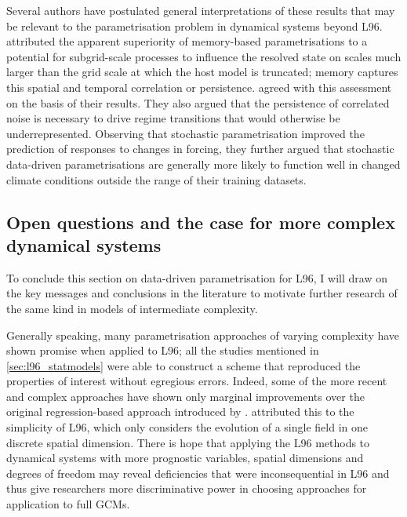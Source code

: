 \documentclass[titlepage,twoside]{article}
\numberwithin{equation}{section}
\begin{document}
Several authors have postulated general interpretations of these results that
may be relevant to the parametrisation problem in dynamical systems beyond L96.
\textcite{arnold2013} attributed the apparent superiority of memory-based
parametrisations to a potential for subgrid-scale processes to influence the
resolved state on scales much larger than the grid scale at which the host
model is truncated; memory captures this spatial and temporal correlation or
persistence. \textcite{christensen2015} agreed with this assessment on the
basis of their results. They also argued that the persistence of correlated
noise is necessary to drive regime transitions that would otherwise be
underrepresented. Observing that stochastic parametrisation improved the
prediction of responses to changes in forcing, they further argued that
stochastic data-driven parametrisations are generally more likely to function
well in changed climate conditions outside the range of their training
datasets.


\subsection{Open questions and the case for more complex dynamical systems}
To conclude this section on data-driven parametrisation for L96, I will draw on
the key messages and conclusions in the literature to motivate further research
of the same kind in models of intermediate complexity.

Generally speaking, many parametrisation approaches of varying complexity have
shown promise when applied to L96; all the studies mentioned in
\cref{sec:l96_statmodels} were able to construct a scheme that reproduced the
properties of interest without egregious errors. Indeed, some of the more
recent and complex approaches have shown only marginal improvements over the
original regression-based approach introduced by \textcite{wilks2005}.
\textcite{gagne2020} attributed this to the simplicity of L96, which only
considers the evolution of a single field in one discrete spatial dimension.
There is hope that applying the L96 methods to dynamical systems with more
prognostic variables, spatial dimensions and degrees of freedom may reveal
deficiencies that were inconsequential in L96 and thus give researchers more
discriminative power in choosing approaches for application to full GCMs.
\end{document}
